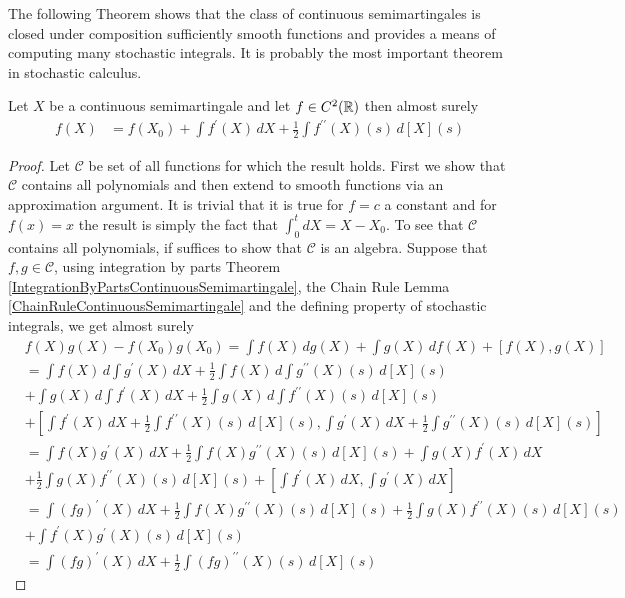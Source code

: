The following Theorem shows that the class of continuous semimartingales is closed under composition sufficiently smooth functions and provides a means of computing many stochastic integrals.  It is probably the most important theorem in stochastic calculus.
\begin{thm}\label{ItoLemmaContinuousSemimartingale}Let $X$ be a continuous semimartingale and let $f \in C^2(\mathbb{R})$ then almost surely
\begin{align*}
f(X) &= f(X_0) + \int f^\prime(X) \, dX + \frac{1}{2} \int f^{\prime \prime}(X) (s) \, d[X](s)
\end{align*}
\end{thm}
\begin{proof}
Let $\mathcal{C}$ be set of all functions for which the result holds.
First we show that $\mathcal{C}$ contains all polynomials and then extend to smooth functions via an approximation argument.  It is trivial that it is true for $f=c$ a constant and for $f(x) = x$ the result is simply the fact that $\int_0^t dX = X - X_0$.  To see that $\mathcal{C}$ contains all polynomials, if suffices to show that $\mathcal{C}$ is an algebra.  Suppose that $f,g \in \mathcal{C}$, using integration by parts Theorem \ref{IntegrationByPartsContinuousSemimartingale}, the Chain Rule Lemma \ref{ChainRuleContinuousSemimartingale} and the defining property of stochastic integrals, we get almost surely
\begin{align*}
&f (X) g(X) - f(X_0) g(X_0) = \int f(X) \, dg(X) + \int g(X) \, df(X) + [f(X), g(X)] \\
&=\int f(X) \, d\int g^{\prime}(X) \, dX + \frac{1}{2} \int f(X) \, d\int g^{\prime \prime}(X)(s) \, d[X](s) \\
&+ \int g(X) \, d\int f^{\prime}(X) \, dX + \frac{1}{2} \int g(X) \, d\int f^{\prime \prime}(X)(s) \, d[X](s) \\
&+ [\int f^{\prime}(X)\, dX + \frac{1}{2}\int f^{\prime \prime}(X)(s) \, d[X](s) , \int g^{\prime} (X) \, dX + \frac{1}{2} \int g^{\prime\prime}(X)(s) \, d[X](s)] \\
&=\int f(X)  g^{\prime}(X) \, dX + \frac{1}{2} \int f(X) g^{\prime \prime}(X) (s) \, d[X](s) + \int g(X)  f^{\prime}(X) \, dX\\
&+ \frac{1}{2} \int g(X) f^{\prime \prime}(X)(s) \, d[X](s) + [\int f^{\prime}(X)\, dX , \int g^{\prime} (X) \, dX] \\
&=\int (fg)^{\prime}(X) \, dX + \frac{1}{2} \int f(X) g^{\prime \prime}(X) (s) \, d[X](s) + \frac{1}{2} \int g(X) f^{\prime \prime}(X)(s) \, d[X](s) \\
&+ \int f^{\prime}(X) g^{\prime} (X) (s) \, d[X](s) \\
&=\int (fg)^{\prime}(X) \, dX  + \frac{1}{2} \int (fg)^{\prime \prime}(X)(s) \, d[X](s) 
\end{align*}


\end{proof}
